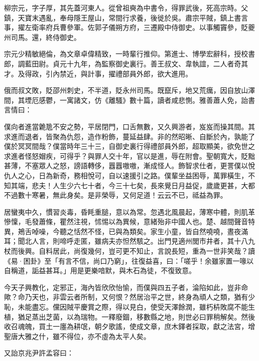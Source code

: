 \begin{pinyinscope}
 柳宗元，字子厚，其先蓋河東人。從曾祖奭為中書令，得罪武後，死高宗時。父鎮，天寶末遇亂，奉母隱王屋山，常間行求養，後徙於吳。肅宗平賊，鎮上書言事，擢左衛率府兵曹參軍。佐郭子儀朔方府，三遷殿中侍御史。以事觸竇參，貶夔州司馬。還，終侍御史。



 宗元少精敏絕倫，為文章卓偉精致，一時輩行推仰。第進士、博學宏辭科，授校書郎，調藍田尉。貞元十九年，為監察御史裏行。善王叔文、韋執誼，二人者奇其才。及得政，引內禁近，與計事，擢禮部員外郎，欲大進用。



 俄而叔文敗，貶邵州刺史，不半道，貶永州司馬。既竄斥，地又荒癘，因自放山澤間，其堙厄感鬱，一寓諸文，仿《離騷》數十篇，讀者咸悲惻。雅善蕭人免，詒書言情曰：



 僕向者進當臲卼不安之勢，平居閉門，口舌無數，又久興游者，岌岌而操其間。其求進而退者，皆聚為仇怨，造作粉飾，蔓延益肆。非的然昭晰、自斷於內，孰能了僕於冥冥間哉？僕當時年三十三，自御史裏行得禮部員外郎，超取顯美，欲免世之求進者怪怒媢疾，可得乎？與罪人交十年，官以是進，辱在附會。聖朝寬大，貶黜甚薄，不塞眾人之怒，謗語轉侈，囂囂嗷嗷，漸成怪人。飾智求仕者，更詈僕以悅仇人之心，日為新奇，務相悅可，自以速援引之路。僕輩坐益困辱，萬罪橫生，不知其端，悲夫！人生少六七十者，今三十七矣，長來覺日月益促，歲歲更甚，大都不過數十寒暑，無此身矣。是非榮辱，又何足道！云云不已，祗益為罪。



 居蠻夷中久，慣習炎毒，昏眊重膇，意以為常。忽遇北風晨起，薄寒中體，則肌革慘懍，毛發蕭條，瞿然注視，怵惕以為異候，意緒殆非中國人也。楚、越間聲音特異，鴂舌啅噪，今聽之恬然不怪，已與為類矣。家生小童，皆自然嘵嘵，晝夜滿耳；聞北人言，則啼呼走匿，雖病夫亦怛然駭之。出門見適州閭市井者，其十八九杖而後興。自料居此，尚復幾何，豈可更不知止，言說長短，重為一世非笑哉？讀《易·困卦》至「有言不信，尚口乃窮」，往復益喜，曰：「嗟乎！余雖家置一喙以自稱道，詬益甚耳。」用是更樂喑默，與木石為徒，不復致意。



 今天子興教化，定邪正，海內皆欣欣怡愉，而僕與四五子者，淪陷如此，豈非命歟？命乃天也，非雲云者所制，又何恨？然居治平之世，終身為頑人之類，猶有少恥，未能盡忘。儻因賊平慶賞之際，得以見白，使受天澤餘潤，雖朽枿敗腐不能生植，猶足蒸出芝菌，以為瑞物。一釋廢錮，移數縣之地，則世必曰罪稍解矣。然後收召魂魄，買土一廛為耕氓，朝夕歌謠，使成文章，庶木鐸者採取，獻之法宮，增聖唐大雅之什，雖不得位，亦不虛為太平人矣。



 又詒京兆尹許孟容曰：




\end{pinyinscope}
